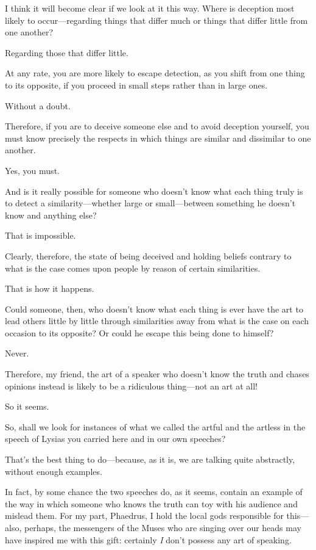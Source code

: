 \saysocrates I think it will become clear if we look at it this way. Where
is deception most likely to occur---regarding things that differ much or
things that differ little from one another?

\sayphaedrus Regarding those that differ little.

\saysocrates At any rate, you are more likely to escape detection, as you
shift from one thing to its opposite, if you proceed in small steps
rather than in large ones.

\sayphaedrus Without a doubt.

\saysocrates Therefore, if you are to deceive someone else and to avoid
deception yourself, you must know precisely the respects in which things
are similar and dissimilar to one another.

\sayphaedrus Yes, you must.

\saysocrates And is it really possible for someone who doesn't know what
each thing truly is to detect a similarity---whether large or
small---between something he doesn't know and anything else?

\sayphaedrus That is impossible.

\saysocrates Clearly, therefore, the state of being deceived and holding
beliefs contrary to what is the case comes upon people by reason of
certain similarities.

\sayphaedrus That is how it happens.

\saysocrates Could someone, then, who doesn't know what each thing is ever
have the art to lead others little by little through similarities away
from what is the case on each occasion to its opposite? Or could he
escape this being done to himself?

\sayphaedrus Never.

\saysocrates Therefore, my friend, the art of a speaker who doesn't know 
the truth and chases opinions instead is likely to be a
ridiculous thing---not an art at all!

\sayphaedrus So it seems.

\saysocrates So, shall we look for instances of what we called the artful
and the artless in the speech of Lysias you carried here and in our own
speeches?

\sayphaedrus That's the best thing to do---because, as it is, we are
talking quite abstractly, without enough examples.

\saysocrates In fact, by some chance the two speeches do, as it seems,
contain an example of the way in which someone who knows the truth 
can toy with his audience and mislead them. For my part,
Phaedrus, I hold the local gods responsible for this---also, perhaps,
the messengers of the Muses who are singing over our heads may have
inspired me with this gift: certainly {\em I} don't possess any art of
speaking.

